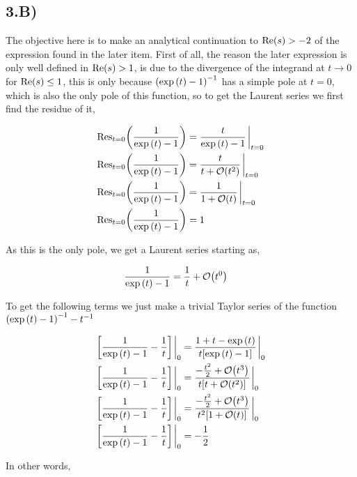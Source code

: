 \subsection{3.B)}

The objective here is to make an analytical continuation to $\textnormal{Re}\qty(s)>-2$ of the expression found in the later item. 
First of all, the reason the later expression is only well defined in $\textnormal{Re}\qty(s)>1$, is due to the divergence of the 
integrand at $t\rightarrow 0$ for $\textnormal{Re}\qty(s)\leq1$, this is only because $\qty(\exp\qty(t)-1)^{-1}$ has a simple pole at $t=0$, which 
is also the only pole of this function, so to get the Laurent series we first find the residue of it,

\begin{align*}
    \textnormal{Res}_{t=0}\qty(\frac{1}{\exp\qty(t)-1})&=\frac{t}{\exp\qty(t)-1}\eval_{t=0}\\
    \textnormal{Res}_{t=0}\qty(\frac{1}{\exp\qty(t)-1})&=\frac{t}{t+\mathcal O\qty(t^2)}\eval_{t=0}\\
    \textnormal{Res}_{t=0}\qty(\frac{1}{\exp\qty(t)-1})&=\frac{1}{1+\mathcal O\qty(t)}\eval_{t=0}\\
    \textnormal{Res}_{t=0}\qty(\frac{1}{\exp\qty(t)-1})&=1
\end{align*}

As this is the only pole, we get a Laurent series starting as,

\begin{align*}
    \frac{1}{\exp\qty(t)-1}&=\frac1t+\mathcal O\qty(t^0)
\end{align*}

To get the following terms we just make a trivial Taylor series of the function $\qty(\exp\qty(t)-1)^{-1}-t^{-1}$

\begin{align*}
    \qty[\frac{1}{\exp\qty(t)-1}-\frac1t]\eval_0&=\frac{1+t-\exp\qty(t)}{t\qty[\exp\qty(t)-1]}\eval_0\\
    \qty[\frac{1}{\exp\qty(t)-1}-\frac1t]\eval_0&=\frac{-\frac{t^2}{2}+\mathcal O\qty(t^3)}{t\qty[t+\mathcal O\qty(t^2)]}\eval_0\\
    \qty[\frac{1}{\exp\qty(t)-1}-\frac1t]\eval_0&=\frac{-\frac{t^2}{2}+\mathcal O\qty(t^3)}{t^2\qty[1+\mathcal O\qty(t)]}\eval_0\\
    \qty[\frac{1}{\exp\qty(t)-1}-\frac1t]\eval_0&=-\frac12
\end{align*}

In other words,

